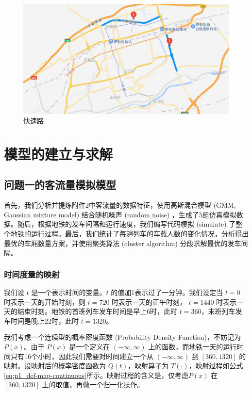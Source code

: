 \documentclass[12pt,a4paper]{mcmthesis}
\begin{document}
    \begin{figure}[h]
        \centering
        \includegraphics[scale=0.6]{figures/fast-road}
        \caption{\song\wuhao 快速路}
        \label{fig:p4_fast-road}
    \end{figure}


    \section{模型的建立与求解}

    \subsection{问题一的客流量模拟模型}

    首先，我们分析并提炼附件2中客流量的数据特征，使用高斯混合模型 (GMM, Gaussian mixture model) 结合随机噪声 (random noise) ，生成了5组仿真模拟数据。随后，根据地铁的发车间隔和运行速度，我们编写代码模拟 (simulate) 了整个地铁的运行过程。最后，我们统计了每趟列车的车载人数的变化情况，分析得出最优的车厢数量方案，并使用聚类算法 (cluster algorithm) 分段求解最优的发车间隔。

    \subsubsection{时间度量的映射}

    我们设 $t$ 是一个表示时间的变量。$t$ 的值加1表示过了一分钟。我们设定当 $t=0$ 时表示一天的开始时刻，则 $t=720$ 时表示一天的正午时刻， $t=1440$ 时表示一天的结束时刻。地铁的首班列车发车时间是早上6时，此时 $t=360$，末班列车发车时间是晚上22时，此时 $t=1320$。

    我们考虑一个连续型的概率密度函数 (Probability Density Function)，不妨记为 $P(x)$。由于 $P(x)$ 是一个定义在 $(-\infty,\infty)$ 上的函数，而地铁一天的运行时间只有16个小时，因此我们需要对时间建立一个从 $(-\infty,\infty)$ 到 $[360,1320]$ 的映射。设映射后的概率密度函数为 $Q(t)$，映射算子为 $T(\cdot)$，映射过程如公式\ref{eq:p1_def-map-continuous}所示。映射过程的含义是，仅考虑$P(x)$ 在 $[360,1320]$ 上的取值，再做一个归一化操作。
\end{document}
